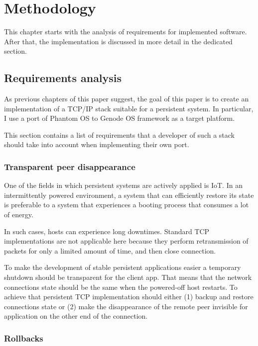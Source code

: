 \chapter{Methodology}
\label{chap:meth}

This chapter starts with the analysis of requirements for implemented software.
After that, the implementation is discussed in more detail in the dedicated
section.

\section {Requirements analysis}

As previous chapters of this paper suggest, the goal of this paper is to create
an implementation of a TCP/IP stack suitable for a persistent system. In
particular, I use a port of Phantom OS to Genode OS framework as a target
platform.

This section contains a list of requirements that a developer of such a stack
should take into account when implementing their own port.

\subsection {Transparent peer disappearance}
One of the fields in which persistent systems are actively applied is IoT. In an
intermittently powered environment, a system that can efficiently restore its
state is preferable to a system that experiences a booting process that consumes 
a lot of energy.

In such cases, hosts can experience long downtimes. Standard TCP implementations
are not applicable here because they perform retransmission of packets for only
a limited amount of time, and then close connection.

To make the development of stable persistent applications easier a temporary 
shutdown should be transparent for the client app. That means that the network 
connections state should be the same when the powered-off host restarts.
To achieve that persistent TCP implementation should either (1) backup and
restore connections state or (2) make the disappearance of the remote peer
invisible for application on the other end of the connection.

\subsection {Rollbacks}


